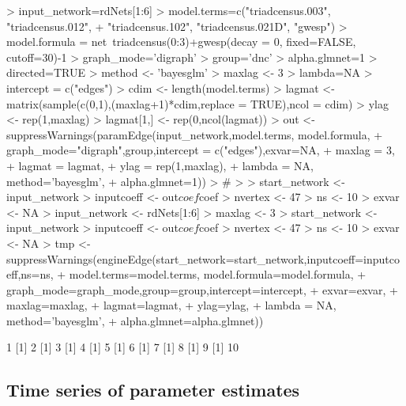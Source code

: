 \documentclass[12pt]{article}
\begin{document}
\begin{Schunk}
\begin{Sinput}
> input_network=rdNets[1:6]
> model.terms=c("triadcensus.003", "triadcensus.012",
+               "triadcensus.102", "triadcensus.021D", "gwesp")
> model.formula = net~triadcensus(0:3)+gwesp(decay = 0, fixed=FALSE, cutoff=30)-1
> graph_mode='digraph'
> group='dnc'
> alpha.glmnet=1
> directed=TRUE
> method <- 'bayesglm'
> maxlag <- 3
> lambda=NA
> intercept = c("edges")
> cdim <- length(model.terms)
> lagmat <- matrix(sample(c(0,1),(maxlag+1)*cdim,replace = TRUE),ncol = cdim)
> ylag <- rep(1,maxlag)
> lagmat[1,] <- rep(0,ncol(lagmat))
> out <- suppressWarnings(paramEdge(input_network,model.terms, model.formula,
+                 graph_mode="digraph",group,intercept = c("edges"),exvar=NA,
+                 maxlag = 3,
+                 lagmat = lagmat,
+                 ylag = rep(1,maxlag),
+                 lambda = NA, method='bayesglm',
+                 alpha.glmnet=1))
> #
> 
> start_network <- input_network
> inputcoeff <- out$coef$coef
> nvertex <- 47
> ns <- 10
> exvar <- NA
> input_network <- rdNets[1:6]
> maxlag <- 3
> start_network <- input_network
> inputcoeff <- out$coef$coef
> nvertex <- 47
> ns <- 10
> exvar <- NA
> tmp <- suppressWarnings(engineEdge(start_network=start_network,inputcoeff=inputcoeff,ns=ns,
+                      model.terms=model.terms, model.formula=model.formula,
+                      graph_mode=graph_mode,group=group,intercept=intercept,
+                      exvar=exvar,
+                      maxlag=maxlag,
+                      lagmat=lagmat,
+                      ylag=ylag,
+                      lambda = NA, method='bayesglm',
+                      alpha.glmnet=alpha.glmnet))
\end{Sinput}
\begin{Soutput}
[1] 1
[1] 2
[1] 3
[1] 4
[1] 5
[1] 6
[1] 7
[1] 8
[1] 9
[1] 10
\end{Soutput}
\end{Schunk}

\subsection{Time series of parameter estimates}
\label{sec:time-seri-param}
\end{document}
